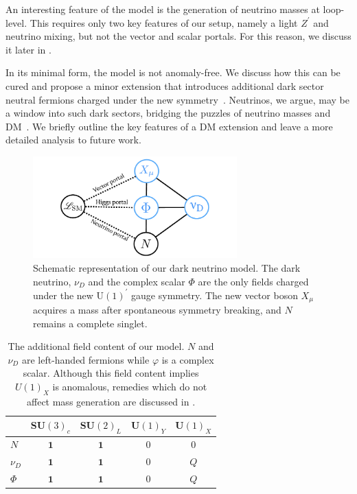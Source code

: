 An interesting feature of the model is the generation of neutrino masses at loop-level. This requires only two key features of our setup, namely a light $Z^\prime$ and neutrino mixing, but not the vector and scalar portals. For this reason, we discuss it later in .

In its minimal form, the model is not anomaly-free. We discuss how this can be cured and propose a minor extension that introduces additional dark sector neutral fermions charged under the new symmetry~\cite{Boehm:2003hm,Boehm:2003ha}. Neutrinos, we argue, may be a window into such dark sectors, bridging the puzzles of neutrino masses and DM~\cite{Ma:2006km,Farzan:2009ji,Farzan:2010mr,Arhrib:2015dez,Cherry:2014xra,Escudero:2016tzx,Escudero:2016ksa,Batell:2017cmf,Capozzi:2017auw,Campo:2017nwh,Blennow:2019fhy}. We briefly outline the key features of a DM extension and leave a more detailed analysis to future work.
%
\begin{figure}[t]
\centering\includegraphics[width=0.7\textwidth]{portals.pdf}
\caption[Dark neutrino model diagram.]{Schematic representation of our dark neutrino model. The dark neutrino, $\nu_{D}$ and the complex scalar $\Phi$ are the only fields charged under the new U$(1)^\prime$ gauge symmetry. The new vector boson $X_\mu$ acquires a mass after spontaneous symmetry breaking, and $N$ remains a complete singlet.
\label{fig:dark_nus_model}}
\end{figure}
%
\begin{table}[h]
\centering
\begin{tabular}{l | c c c c}
~ & SU$(3)_c$ & SU$(2)_L$ & U$(1)_Y$ & U$(1)_X$\\
\hline
$N$ & $\mathbf{1}$ & $\mathbf{1}$ & 0 & 0\\
$\nu_D$ & $\mathbf{1}$ & $\mathbf{1}$ & 0 & $Q$\\
$\Phi$ & $\mathbf{1}$ & $\mathbf{1}$ & 0 & $Q$\\
\end{tabular}
%
\caption[Dark neutrino model particle content.]{\label{tab:fields}The additional field content of our model. $N$ and $\nu_D$ are left-handed fermions while $\varphi$ is a complex scalar. Although this field content implies $U(1)_X$ is anomalous, remedies which do not affect mass generation are discussed in .}
%
\end{table}
